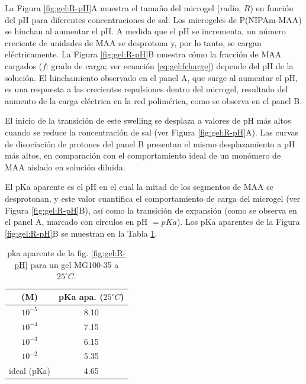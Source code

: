 La Figura \ref{fig:gel:R-pH}A muestra el tama\~no del microgel (radio, $R$) en funci\'on del pH para diferentes concentraciones de sal. Los microgeles de P(NIPAm-MAA) se hinchan al aumentar el pH. A medida que el pH se incrementa, un n\'umero creciente de unidades  de MAA se desprotona y, por lo tanto, se cargan el\'ectricamente. La Figura \ref{fig:gel:R-pH}B muestra c\'omo la fracci\'on de MAA cargados ($f$: grado de carga; ver ecuaci\'on \ref{eq:gel:fcharge}) depende del pH de la soluci\'on. El hinchamiento observado en el panel A, que surge al aumentar el pH, es una respuesta a las crecientes repulsiones dentro del microgel, resultado del aumento de la carga el\'ectrica en la red polim\'erica, como se observa en el panel B.

El inicio de la transici\'on de este swelling se desplaza a valores de pH m\'as altos cuando se reduce la concentraci\'on de sal (ver Figura \ref{fig:gel:R-pH}A). Las curvas de disociaci\'on de protones del panel B presentan el mismo desplazamiento a pH m\'as altos, en comparaci\'on con el comportamiento ideal de un mon\'omero de MAA aislado en soluci\'on diluida.%

El pKa aparente es el pH en el cual la mitad de los segmentos de MAA se desprotonan, y este valor cuantifica el comportamiento de carga del microgel (ver Figura \ref{fig:gel:R-pH}B), as\'i como la transici\'on de expansi\'on (como se observa en el panel A, marcado con c\'irculos en pH $=pKa$). Los pKa aparentes de la Figura \ref{fig:gel:R-pH}B se muestran en la Tabla \ref{table:gel:pKa_app}.





\begin{table}[!htb]
\centering
\small
  \begin{tabular}{|cc|}
    \hline
      [KCl] (M)&  pKa apa. ($25 ^\circ C$)  \\
      \hline
    $10^{-5}$ & 8.10  \\
    $10^{-4}$ & 7.15 \\
    $10^{-3}$ & 6.15 \\
    $10^{-2}$ & 5.35 \\
    ideal (pKa) &  4.65  \\
    \hline
  \end{tabular}
 \caption{ pka  aparente de la fig. \ref{fig:gel:R-pH} para un gel MG100-35 a $25 ^\circ C$.}
\label{table:gel:pKa_app} 
\end{table}


